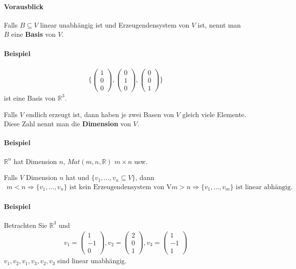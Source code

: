 \documentclass[11pt]{report}
\newcommand*\Zb[1] {\mathbb{#1}}
\newcommand*\f[1] {\textbf{#1}}
\begin{document}
\paragraph{Vorausblick}
Falls $B \subseteq V$ linear unabhängig ist und Erzeugendensystem von $V$ ist, nennt man $B$ eine \f{Basis} von $V$.
\paragraph{Beispiel}
\begin{align}
 \{\begin{pmatrix} 1 \\ 0 \\ 0 \end{pmatrix}, \begin{pmatrix} 0 \\ 1 \\ 0 \end{pmatrix}, \begin{pmatrix} 0 \\ 0 \\ 1 \end{pmatrix}\}
\end{align}
ist eine Basis von $\Zb{R}^3$.

Falls $V$ endlich erzeugt ist, dann haben je zwei Basen von $V$ gleich viele Elemente. Diese Zahl nennt man die \f{Dimension} von $V$.

\paragraph{Beispiel}
$\Zb{R}^n$ hat Dimension $n$, $Mat(m,n,\Zb{R})$ $m\times n$ usw. 

Falls $V$ Dimension $n$ hat und $\{v_1, ..., v_n \subseteq V\}$, dann
\begin{align}
 m < n \Rightarrow \{v_1, ..., v_n\} \text{ ist kein Erzeugendensystem von V}
 m > n \Rightarrow \{v_1, ..., v_m\} \text{ ist linear abhängig.}
\end{align}

\paragraph{Beispiel}
Betrachten Sie $\Zb{R}^3$ und 
\begin{align}
 v_1 = \begin{pmatrix} 1 \\ -1 \\ 0 \end{pmatrix}, v_2 = \begin{pmatrix} 2 \\ 0 \\ 1 \end{pmatrix}, v_3 = \begin{pmatrix} 1 \\ -1 \\ 1 \end{pmatrix}
\end{align}
${v_1, v_2}, {v_1, v_3}, {v_2, v_3}$ sind linear unabhängig.
\end{document}
